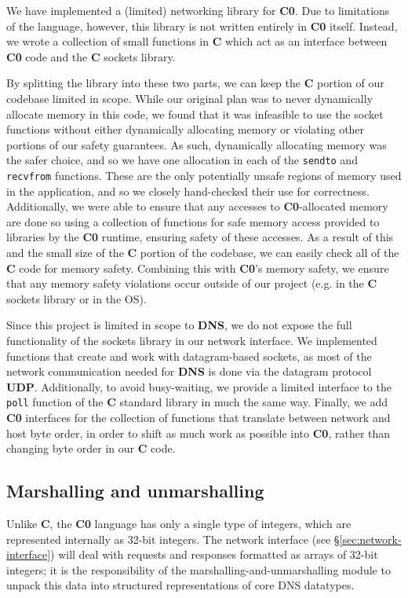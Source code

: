 \documentclass{article}
\newcommand\Kwd[1]{{\sffamily\bfseries{#1}}}
\begin{document}
We have implemented a (limited) networking library for \Kwd{C0}. Due to limitations of the language, however, this library is not written entirely in \Kwd{C0} itself. Instead, we wrote a collection of small functions in \Kwd{C} which act as an interface between \Kwd{C0} code and the \Kwd{C} sockets library.

By splitting the library into these two parts, we can keep the \Kwd{C} portion of our codebase limited in scope. While our original plan was to never dynamically allocate memory in this code, we found that it was infeasible to use the socket functions without either dynamically allocating memory or violating other portions of our safety guarantees. As such, dynamically allocating memory was the safer choice, and so we have one allocation in each of the \texttt{sendto} and \texttt{recvfrom} functions. These are the only potentially unsafe regions of memory used in the application, and so we closely hand-checked their use for correctness. Additionally, we were able to ensure that any accesses to \Kwd{C0}-allocated memory are done so  using a collection of functions for safe memory access provided to libraries by the \Kwd{C0} runtime, ensuring safety of these accesses. As a result of this and the small size of the \Kwd{C} portion of the codebase, we can easily check all of the \Kwd{C} code for memory safety. Combining this with \Kwd{C0}'s memory safety, we ensure that any memory safety violations occur outside of our project (e.g. in the \Kwd{C} sockets library or in the OS).

Since this project is limited in scope to \Kwd{DNS}, we do not expose the full functionality of the sockets library in our network interface. We implemented functions that create and work with datagram-based sockets, as most of the network communication needed for \Kwd{DNS} is done via the datagram protocol \Kwd{UDP}. Additionally, to avoid busy-waiting, we provide a limited interface to the \texttt{poll} function of the \Kwd{C} standard library in much the same way. Finally, we add \Kwd{C0} interfaces for the collection of functions that translate between network and host byte order, in order to shift as much work as possible into \Kwd{C0}, rather than changing byte order in our \Kwd{C} code.

\subsection{Marshalling and unmarshalling}

Unlike \Kwd{C}, the \Kwd{C0} language has only a single type of
integers, which are represented internally as 32-bit integers. The
network interface (see \S\ref{sec:network-interface}) will deal with
requests and responses formatted as arrays of 32-bit integers; it is
the responsibility of the marshalling-and-unmarshalling module to
unpack this data into structured representations of core DNS
datatypes.
\end{document}
